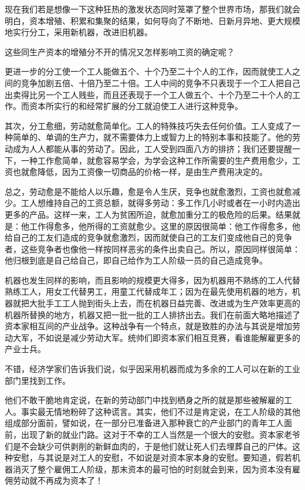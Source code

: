 \documentclass[a4paper,twoside,12pt,AutoFakeBold]{ctexart}
\begin{document}
现在我们若是想像一下这种狂热的激发状态同时笼罩了整个世界市场，那我们就会明白，资本增殖、积累和集聚的结果，如何导向了不断地、日新月异地、更大规模地实行分工，采用新机器，改进旧机器。

这些同生产资本的增殖分不开的情况又怎样影响工资的确定呢？

更进一步的分工使一个工人能做五个、十个乃至二十个人的工作，因而就使工人之间的竞争加剧五倍、十倍乃至二十倍。工人中间的竞争不只表现于一个工人把自己出卖得比另一个工人贱些，而且还表现于一个工人做五个、十个乃至二十个人的工作。而资本所实行的和经常扩展的分工就迫使工人进行这种竞争。

其次，分工愈细，劳动就愈简单化。工人的特殊技巧失去任何价值。工人变成了一种简单的、单调的生产力，就不需要体力上或智力上的特别本事和技能了。他的劳动成为人人都能从事的劳动了。因此，工人受到四面八方的排挤；我们还要提醒一下，一种工作愈简单，就愈容易学会，为学会这种工作所需要的生产费用愈少，工资也就愈降低，因为工资像一切商品的价格一样，是由生产费用决定的。

总之，劳动愈是不能给人以乐趣，愈是令人生厌，竞争也就愈激烈，工资也就愈减少。工人想维持自己的工资总额，就得多劳动：多工作几小时或者在一小时内造出更多的产品。这样一来，工人为贫困所迫，就愈加重分工的极危险的后果。结果就是：他工作得愈多，他所得的工资就愈少。这里的原因很简单：他工作得愈多，他给自己的工友们造成的竞争就愈激烈，因而就使自己的工友们变成他自己的竞争者，这些竞争者也像他一样按同样恶劣的条件出卖自己。所以，原因同样很简单：他归根到底是自己给自己，即自己给作为工人阶级一员的自己造成竞争。

机器也发生同样的影响，而且影响的规模更大得多，因为机器用不熟练的工人代替熟练工人，用女工代替男工，用童工代替成年工；因为在最先使用机器的地方，机器就把大批手工工人抛到街头上去，而在机器日益完善、改进或为生产效率更高的机器所替换的地方，机器又把一批一批的工人排挤出去。我们在前面大略地描述了资本家相互间的产业战争。这种战争有一个特点，就是致胜的办法与其说是增加劳动大军，不如说是减少劳动大军。统帅们即资本家们相互竞赛，看谁能解雇更多的产业士兵。

不错，经济学家们告诉我们说，似乎因采用机器而成为多余的工人可以在新的工业部门里找到工作。

他们不敢干脆地肯定说，在新的劳动部门中找到栖身之所的就是那些被解雇的工人。事实最无情地粉碎了这种谎言。其实，他们不过是肯定说，在工人阶级的其他组成部分面前，譬如说，在一部分已准备进入那种衰亡的产业部门的青年工人面前，出现了新的就业门路。这对于不幸的工人当然是一个很大的安慰。资本家老爷们是不会缺少可供剥削的新鲜血肉的，于是他们就让死人们去埋葬自己的尸体。这种安慰，与其说是对工人的安慰，不如说是对资本家本身的安慰。要知道，假若机器消灭了整个雇佣工人阶级，那末资本的最可怕的时刻就会到来，因为资本没有雇佣劳动就不再成为资本了！
\end{document}

